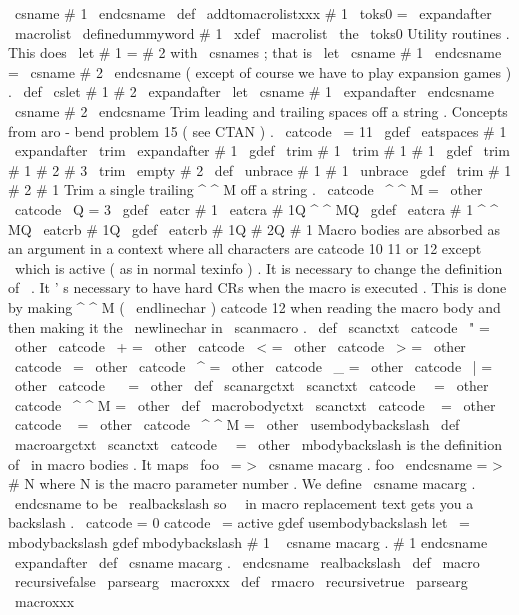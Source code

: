 {{\
csname
#
1
\
endcsname
}
\
def
\
addtomacrolistxxx
#
1
{
%
\
toks0
=
\
expandafter
{
\
macrolist
\
definedummyword
#
1
}
%
\
xdef
\
macrolist
{
\
the
\
toks0
}
%
}
%
Utility
routines
.
%
This
does
\
let
#
1
=
#
2
with
\
csnames
;
that
is
%
\
let
\
csname
#
1
\
endcsname
=
\
csname
#
2
\
endcsname
%
(
except
of
course
we
have
to
play
expansion
games
)
.
%
\
def
\
cslet
#
1
#
2
{
%
\
expandafter
\
let
\
csname
#
1
\
expandafter
\
endcsname
\
csname
#
2
\
endcsname
}
%
Trim
leading
and
trailing
spaces
off
a
string
.
%
Concepts
from
aro
-
bend
problem
15
(
see
CTAN
)
.
{
\
catcode
\
=
11
\
gdef
\
eatspaces
#
1
{
\
expandafter
\
trim
\
expandafter
{
#
1
}
}
\
gdef
\
trim
#
1
{
\
trim
#
1
#
1
}
\
gdef
\
trim
#
1
#
2
#
3
{
\
trim
\
empty
#
2
}
\
def
\
unbrace
#
1
{
#
1
}
\
unbrace
{
\
gdef
\
trim
#
1
}
#
2
{
#
1
}
}
%
Trim
a
single
trailing
^
^
M
off
a
string
.
{
\
catcode
\
^
^
M
=
\
other
\
catcode
\
Q
=
3
%
\
gdef
\
eatcr
#
1
{
\
eatcra
#
1Q
^
^
MQ
}
%
\
gdef
\
eatcra
#
1
^
^
MQ
{
\
eatcrb
#
1Q
}
%
\
gdef
\
eatcrb
#
1Q
#
2Q
{
#
1
}
%
}
%
Macro
bodies
are
absorbed
as
an
argument
in
a
context
where
%
all
characters
are
catcode
10
11
or
12
except
\
which
is
active
%
(
as
in
normal
texinfo
)
.
It
is
necessary
to
change
the
definition
of
\
.
%
It
'
s
necessary
to
have
hard
CRs
when
the
macro
is
executed
.
This
is
%
done
by
making
^
^
M
(
\
endlinechar
)
catcode
12
when
reading
the
macro
%
body
and
then
making
it
the
\
newlinechar
in
\
scanmacro
.
\
def
\
scanctxt
{
%
\
catcode
\
"
=
\
other
\
catcode
\
+
=
\
other
\
catcode
\
<
=
\
other
\
catcode
\
>
=
\
other
\
catcode
\
=
\
other
\
catcode
\
^
=
\
other
\
catcode
\
_
=
\
other
\
catcode
\
|
=
\
other
\
catcode
\
~
=
\
other
}
\
def
\
scanargctxt
{
%
\
scanctxt
\
catcode
\
\
=
\
other
\
catcode
\
^
^
M
=
\
other
}
\
def
\
macrobodyctxt
{
%
\
scanctxt
\
catcode
\
{
=
\
other
\
catcode
\
}
=
\
other
\
catcode
\
^
^
M
=
\
other
\
usembodybackslash
}
\
def
\
macroargctxt
{
%
\
scanctxt
\
catcode
\
\
=
\
other
}
%
\
mbodybackslash
is
the
definition
of
\
in
macro
bodies
.
%
It
maps
\
foo
\
=
>
\
csname
macarg
.
foo
\
endcsname
=
>
#
N
%
where
N
is
the
macro
parameter
number
.
%
We
define
\
csname
macarg
.
\
endcsname
to
be
\
realbackslash
so
%
\
\
in
macro
replacement
text
gets
you
a
backslash
.
{
\
catcode
=
0
catcode
\
=
active
gdef
usembodybackslash
{
let
\
=
mbodybackslash
}
gdef
mbodybackslash
#
1
\
{
csname
macarg
.
#
1
endcsname
}
}
\
expandafter
\
def
\
csname
macarg
.
\
endcsname
{
\
realbackslash
}
\
def
\
macro
{
\
recursivefalse
\
parsearg
\
macroxxx
}
\
def
\
rmacro
{
\
recursivetrue
\
parsearg
\
macroxxx
}}
